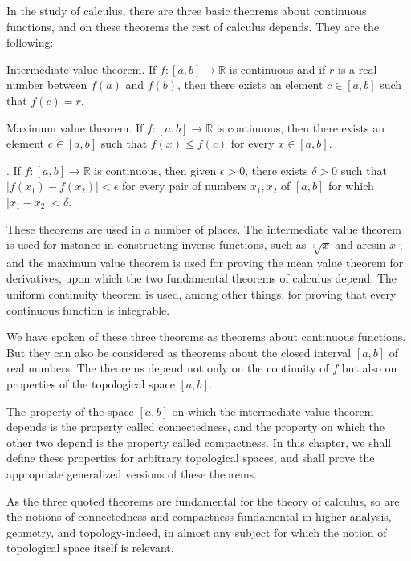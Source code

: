 
In the study of calculus, there are three basic theorems about continuous functions, and on these theorems the rest of calculus depends. They are the following:

Intermediate value theorem. If \(f : [ {a,b}] \rightarrow \mathbb{R}\) is continuous and if \(r\) is a real number between \(f( a)\) and \(f( b)\), then there exists an element \(c \in [ {a,b}]\) such that \(f( c) = r\).

 Maximum value theorem. If \(f : [ {a,b}] \rightarrow \mathbb{R}\) is continuous, then there exists an element \(c \in [ {a,b}]\) such that \(f(x) \leq f( c)\) for every \(x \in [ {a,b}]\).

. If \(f : [ {a,b}] \rightarrow \mathbb{R}\) is continuous, then given \(\epsilon > 0\), there exists \(\delta > 0\) such that \(| {f( x_{1}) - f( x_{2}) }| < \epsilon\) for every pair of numbers \(x_{1},x_{2}\) of \([ {a,b}]\) for which \(| {x_{1} - x_{2}}| < \delta\).

These theorems are used in a number of places. The intermediate value theorem is used for instance in constructing inverse functions, such as \(\sqrt[3]{x}\) and arcsin \(x\) ; and the maximum value theorem is used for proving the mean value theorem for derivatives, upon which the two fundamental theorems of calculus depend. The uniform continuity theorem is used, among other things, for proving that every continuous function is integrable.

We have spoken of these three theorems as theorems about continuous functions. But they can also be considered as theorems about the closed interval \([ {a,b}]\) of real numbers. The theorems depend not only on the continuity of \(f\) but also on properties of the topological space \([ {a,b}]\).

The property of the space \([ {a,b}]\) on which the intermediate value theorem depends is the property called connectedness, and the property on which the other two depend is the property called compactness. In this chapter, we shall define these properties for arbitrary topological spaces, and shall prove the appropriate generalized versions of these theorems.

As the three quoted theorems are fundamental for the theory of calculus, so are the notions of connectedness and compactness fundamental in higher analysis, geometry, and topology-indeed, in almost any subject for which the notion of topological space itself is relevant.

